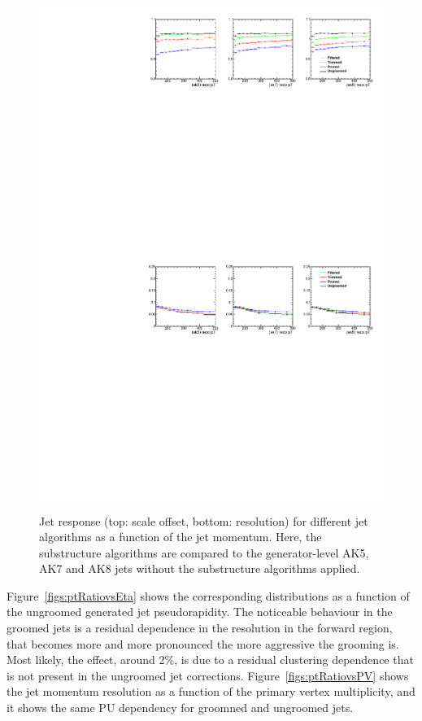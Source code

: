 \begin{figure}[!htb]
\centering
\includegraphics[width=1.0\textwidth]{figs/ptRatioVsPt_mean.pdf}
\includegraphics[width=1.0\textwidth]{figs/ptRatioVsPt_sigma.pdf}
\caption{Jet response (top: scale offset, bottom: resolution) for different jet algorithms as a function of the jet momentum. Here, the
  substructure algorithms are compared to the
  generator-level AK5, AK7 and AK8 jets without the substructure algorithms applied.}
\label{figs:ptRatio}
\end{figure}


Figure~\ref{figs:ptRatiovsEta} shows the corresponding distributions as a function of the ungroomed generated jet pseudorapidity. The noticeable behaviour in the groomed jets is a residual dependence in the resolution in the forward region, that becomes more and more pronounced the more aggressive the grooming is. Most likely, the effect, around 2\%, is due to a residual clustering dependence that is not present in the ungroomed jet corrections.  
Figure~\ref{figs:ptRatiovsPV} shows the jet momentum resolution as a function of the primary vertex multiplicity, and it shows the same PU dependency for groomned and ungroomed jets.  
 

